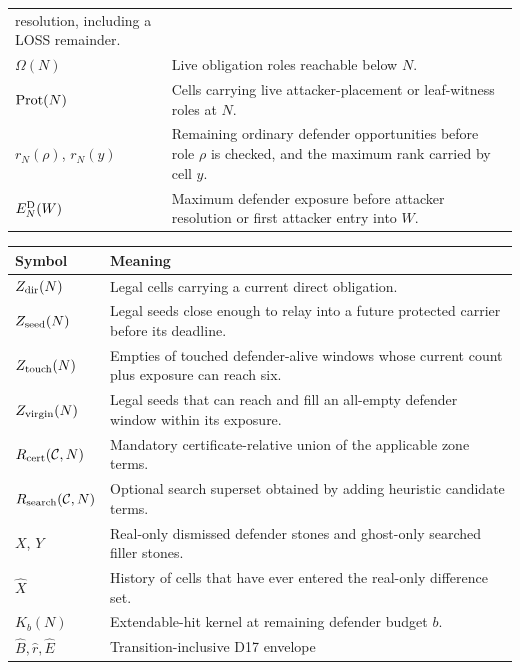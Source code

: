 \begin{appendixtable}
\begin{tabular}{@{}p{}p{}@{}}
      resolution, including a LOSS remainder. \\
    $\Omega(N)$ & Live obligation roles reachable below $N$. \\
    $\operatorname{Prot}(N)$ & Cells carrying live attacker-placement or leaf-witness
      roles at $N$. \\
    $r_N(\rho)$, $r_N(y)$ & Remaining ordinary defender opportunities before
      role $\rho$ is checked, and the maximum rank carried by cell $y$. \\
    $E_N^{\mathrm{D}}(W)$ & Maximum defender exposure before attacker resolution or
      first attacker entry into $W$. \\
    \bottomrule
  \end{tabular}
\end{appendixtable}

\begin{appendixtable}
  \label{tab:notation-zones}
  \small
  \renewcommand{\arraystretch}{1.08}
  \begin{tabular}{@{}p{}p{}@{}}
    \toprule
    Symbol & Meaning \\
    \midrule
    $Z_{\rm dir}(N)$ & Legal cells carrying a current direct obligation. \\
    $Z_{\rm seed}(N)$ & Legal seeds close enough to relay into a future
      protected carrier before its deadline. \\
    $Z_{\rm touch}(N)$ & Empties of touched defender-alive windows whose
      current count plus exposure can reach six. \\
    $Z_{\rm virgin}(N)$ & Legal seeds that can reach and fill an all-empty
      defender window within its exposure. \\
    $R_{\rm cert}(\mathcal C,N)$ & Mandatory certificate-relative union of
      the applicable zone terms. \\
    $R_{\rm search}(\mathcal C,N)$ & Optional search superset obtained by
      adding heuristic candidate terms. \\
    $X$, $Y$ & Real-only dismissed defender stones and ghost-only searched
      filler stones. \\
    $\widehat X$ & History of cells that have ever entered the real-only
      difference set. \\
    $K_b(N)$ & Extendable-hit kernel at remaining defender budget $b$. \\
    $\widehat B,\widehat r,\widehat E$ & Transition-inclusive D17 envelope

\end{tabular}
\end{appendixtable}
